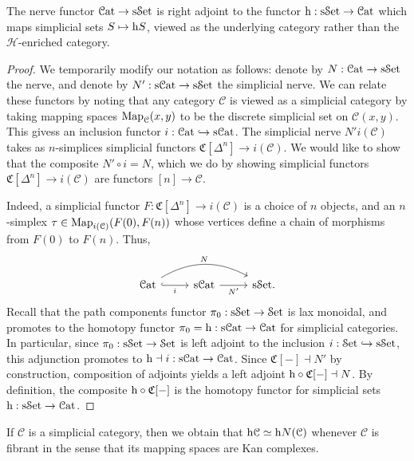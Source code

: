 \begin{proposition}\label{1.2.3.1}
	The nerve functor $\mathcal{C}\mathrm{at} \to \mathrm{s}\mathcal{S}\mathrm{et} $ is right adjoint to the functor $\mathrm{h} : \mathrm{s}\mathcal{S}\mathrm{et}  \to \mathcal{C}\mathrm{at} $ which maps simplicial sets $S\mapsto \mathrm{h} S$, viewed as the underlying category rather than the $\mathcal{H} $-enriched category.
\end{proposition}
\begin{proof}
	We temporarily modify our notation as follows: denote by $N : \mathcal{C}\mathrm{at}  \to \mathrm{s}\mathcal{S}\mathrm{et} $ the nerve, and denote by $N': \mathrm{s} \mathcal{C}\mathrm{at}  \to \mathrm{s}\mathcal{S}\mathrm{et} $ the simplicial nerve. We can relate these functors by noting that any category $\mathcal{C} $ is viewed as a simplicial category by taking mapping spaces $\operatorname{Map}_\mathcal{C} (x,y)$ to be the discrete simplicial set on $\mathcal{C} (x,y)$. This givess an inclusion functor $i : \mathcal{C}\mathrm{at}  \hookrightarrow \mathrm{s} \mathcal{C}\mathrm{at} $. The simplicial nerve $N'i(\mathcal{C} )$ takes as $n$-simplices simplicial functors $\mathfrak{C} [\Delta ^n]\to i(\mathcal{C} )$. We would like to show that the composite $N'\circ i=N$, which we do by showing simplicial functors $\mathfrak{C} [\Delta ^n]\to i(\mathcal{C} )$ are functors $[n]\to \mathcal{C} $.

	Indeed, a simplicial functor $F: \mathfrak{C} [\Delta ^n]\to i(\mathcal{C}) $ is a choice of $n$ objects, and an $n$-simplex $\tau \in \operatorname{Map}_{i(\mathcal{C} )} (F(0),F(n))$ whose vertices define a chain of morphisms from $F(0)$ to $F(n)$. Thus,
	\[\begin{tikzcd}[row sep = 2.5em, column sep = 2.5em]
	\Cat \ar[" N ", bend left, rr] \ar[" i "', hook, r]  & \mathrm{s} \Cat \ar[" N' "', r]  & \sSet .
	\end{tikzcd}\]
	Recall that the path components functor $\pi _0 : \mathrm{s}\mathcal{S}\mathrm{et}  \to \mathcal{S}\mathrm{et} $ is lax monoidal, and promotes to the homotopy functor $\pi _0 = \mathrm{h} : \mathrm{s} \mathcal{C}\mathrm{at}  \to \mathcal{C}\mathrm{at} $ for simplicial categories. In particular, since $\pi _0 : \mathrm{s}\mathcal{S}\mathrm{et}  \to \mathcal{S}\mathrm{et} $ is left adjoint to the inclusion $i : \mathcal{S}\mathrm{et} \hookrightarrow \mathrm{s}\mathcal{S}\mathrm{et} $, this adjunction promotes to $\mathrm{h} \dashv i : \mathrm{s} \mathcal{C}\mathrm{at}  \to \mathcal{C}\mathrm{at} $. Since $\mathfrak{C}[-] \dashv N'$ by construction, composition of adjoints yields a left adjoint $\mathrm{h} \circ \mathfrak{C}[-]\dashv N $. By definition, the composite $\mathrm{h} \circ \mathfrak{C}[-] $ is the homotopy functor for simplicial sets $\mathrm{h} : \mathrm{s}\mathcal{S}\mathrm{et}  \to \mathcal{C}\mathrm{at} $.
\end{proof}

\begin{remark}\label{1.2.3.2}
	If $\mathcal{C} $ is a simplicial category, then we obtain that $\mathrm{h} \mathcal{C} \simeq\mathrm{h} N(\mathcal{C} )$ whenever $\mathcal{C} $ is fibrant in the sense that its mapping spaces are Kan complexes.
\end{remark}

